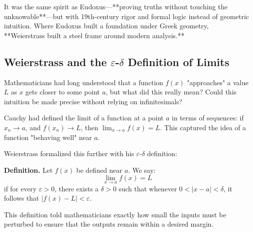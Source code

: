 It was the same spirit as Eudoxus—**proving truths without touching the unknowable**—but with 19th-century rigor and formal logic instead of geometric intuition.  
Where Eudoxus built a foundation under Greek geometry, **Weierstrass built a steel frame around modern analysis.**





\subsection{Weierstrass and the \(\varepsilon\)-\(\delta\) Definition of Limits}

Mathematicians had long understood that a function \( f(x) \) "approaches" a value \( L \) as \( x \) gets closer to some point \( a \), but what did this really mean? Could this intuition be made precise without relying on infinitesimals?

Cauchy had defined the limit of a function at a point \( a \) in terms of sequences: if \( x_n \to a \), and \( f(x_n) \to L \), then \( \lim_{x \to a} f(x) = L \). This captured the idea of a function "behaving well" near \( a \).

Weierstrass formalized this further with his \(\varepsilon\)-\(\delta\) definition:

\vspace{0.5em}
\noindent\textbf{Definition.}
Let \( f(x) \) be defined near \( a \). We say:
\[
\lim_{x \to a} f(x) = L
\]
if for every \( \varepsilon > 0 \), there exists a \( \delta > 0 \) such that whenever \( 0 < |x - a| < \delta \), it follows that \( |f(x) - L| < \varepsilon \).
\vspace{1em}

This definition told mathematicians exactly how small the inputs must be perturbed to ensure that the outputs remain within a desired margin.

